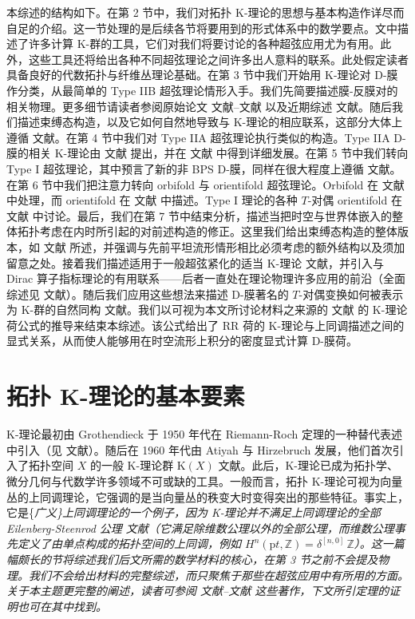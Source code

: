 \documentclass[11pt,a4paper]{ctexart}
\newcommand{\SrcRange}[2]{\marginpar{\raggedright\footnotesize 原文 p.#1}}
\begin{document}
本综述的结构如下。在第 2 节中，我们对拓扑 K-理论的思想与基本构造作详尽而自足的介绍。这一节处理的是后续各节将要用到的形式体系中的数学要点。文中描述了许多计算 K-群的工具，它们对我们将要讨论的各种超弦应用尤为有用。此外，这些工具还将给出各种不同超弦理论之间许多出人意料的联系。此处假定读者具备良好的代数拓扑与纤维丛理论基础。在第 3 节中我们开始用 K-理论对 D-膜作分类，从最简单的 Type IIB 超弦理论情形入手。我们先简要描述膜-反膜对的相关物理。更多细节请读者参阅原始论文 文献--文献 以及近期综述 文献。随后我们描述束缚态构造，以及它如何自然地导致与 K-理论的相应联系，这部分大体上遵循 文献。在第 4 节中我们对 Type IIA 超弦理论执行类似的构造。Type IIA D-膜的相关 K-理论由 文献 提出，并在 文献 中得到详细发展。在第 5 节中我们转向 Type I 超弦理论，其中预言了新的非 BPS D-膜，同样在很大程度上遵循 文献。在第 6 节中我们把注意力转向 orbifold 与 orientifold 超弦理论。Orbifold 在 文献 中处理，而 orientifold 在 文献 中描述。Type I 理论的各种 \(T\)-对偶 orientifold 在 文献 中讨论。最后，我们在第 7 节中结束分析，描述当把时空与世界体嵌入的整体拓扑考虑在内时所引起的对前述构造的修正。这里我们给出束缚态构造的整体版本，如 文献 所述，并强调与先前平坦流形情形相比必须考虑的额外结构以及须加留意之处。接着我们描述适用于一般超弦紧化的适当 K-理论 文献，并引入与 Dirac 算子指标理论的有用联系------后者一直处在理论物理许多应用的前沿（全面综述见 文献）。随后我们应用这些想法来描述 D-膜著名的 \(T\)-对偶变换如何被表示为 K-群的自然同构 文献。我们以可视为本文所讨论材料之来源的 文献 的 K-理论荷公式的推导来结束本综述。该公式给出了 RR 荷的 K-理论与上同调描述之间的显式关系，从而使人能够用在时空流形上积分的密度显式计算 D-膜荷。

\SrcRange{11}{11}
\section{拓扑 K-理论的基本要素}\label{ux62d3ux6251-k-ux7406ux8bbaux7684ux57faux672cux8981ux7d20}

K-理论最初由 Grothendieck 于 1950 年代在 Riemann-Roch 定理的一种替代表述中引入（见 文献）。随后在 1960 年代由 Atiyah 与 Hirzebruch 发展，他们首次引入了拓扑空间 \(X\) 的一般 K-理论群 \({\mathrm K}(X)\) 文献。此后，K-理论已成为拓扑学、微分几何与代数学许多领域不可或缺的工具。一般而言，拓扑 K-理论可视为向量丛的上同调理论，它强调的是当向量丛的秩变大时变得突出的那些特征。事实上，它是\{\it 广义\}上同调理论的一个例子，因为 K-理论并不满足上同调理论的全部 Eilenberg-Steenrod 公理 文献（它满足除维数公理以外的全部公理，而维数公理事先定义了由单点构成的拓扑空间的上同调，例如 \(H^n({\mathrm pt}, {\mathbb{Z}})=\delta^[n,0]\,{\mathbb{Z}}\)）。这一篇幅颇长的节将综述我们后文所需的数学材料的核心，在第 3 节之前不会提及物理。我们不会给出材料的完整综述，而只聚焦于那些在超弦应用中有所用的方面。关于本主题更完整的阐述，读者可参阅 文献--文献 这些著作，下文所引定理的证明也可在其中找到。
\end{document}

